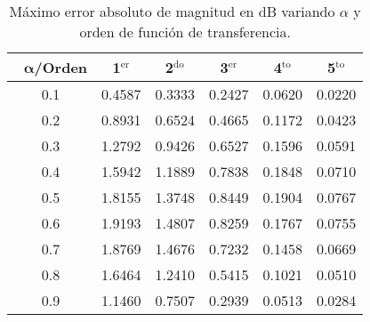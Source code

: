 	\begin{table}[!hbp]                                 
	\centering            
	\caption{Máximo error absoluto de magnitud en dB variando $\alpha$ y orden de función de transferencia.}                           
	\label{tab:max_error_mag}                               
		\begin{tabular}{cccccc}
			\hline                                             
			$\,\,\,\,\bm{\alpha}$\textbf{/Orden} & \textbf{1$^{\mathrm{er}}$} & \textbf{2$^{\mathrm{do}}$} & \textbf{3$^{\mathrm{er}}$} & \textbf{4$^{\mathrm{to}}$} & \textbf{5$^{\mathrm{to}}$} \\                     
			\hline                                             
			0.1 & 0.4587 & 0.3333 & 0.2427 & 0.0620 & 0.0220 \\
			                                           
			0.2 & 0.8931 & 0.6524 & 0.4665 & 0.1172 & 0.0423 \\
			                                            
			0.3 & 1.2792 & 0.9426 & 0.6527 & 0.1596 & 0.0591 \\
			                                            
			0.4 & 1.5942 & 1.1889 & 0.7838 & 0.1848 & 0.0710 \\
			                                            
			0.5 & 1.8155 & 1.3748 & 0.8449 & 0.1904 & 0.0767 \\
			                                           
			0.6 & 1.9193 & 1.4807 & 0.8259 & 0.1767 & 0.0755 \\
			                                            
			0.7 & 1.8769 & 1.4676 & 0.7232 & 0.1458 & 0.0669 \\
			                                            
			0.8 & 1.6464 & 1.2410 & 0.5415 & 0.1021 & 0.0510 \\
			                                           
			0.9 & 1.1460 & 0.7507 & 0.2939 & 0.0513 & 0.0284 \\
			\hline                                             
		\end{tabular}                                                             
	\end{table}


